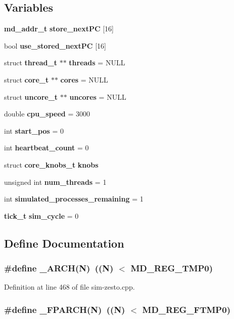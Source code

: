 \subsection*{Variables}
\begin{CompactItemize}
\item 
{\bf md\_\-addr\_\-t} {\bf store\_\-nextPC} [16]
\item 
bool {\bf use\_\-stored\_\-nextPC} [16]
\item 
struct {\bf thread\_\-t} $\ast$$\ast$ {\bf threads} = NULL
\item 
struct {\bf core\_\-t} $\ast$$\ast$ {\bf cores} = NULL
\item 
struct {\bf uncore\_\-t} $\ast$$\ast$ {\bf uncores} = NULL
\item 
double {\bf cpu\_\-speed} = 3000
\item 
int {\bf start\_\-pos} = 0
\item 
int {\bf heartbeat\_\-count} = 0
\item 
struct {\bf core\_\-knobs\_\-t} {\bf knobs}
\item 
unsigned int {\bf num\_\-threads} = 1
\item 
int {\bf simulated\_\-processes\_\-remaining} = 1
\item 
{\bf tick\_\-t} {\bf sim\_\-cycle} = 0
\end{CompactItemize}


\subsection{Define Documentation}
\subsubsection[{\_\-ARCH}]{\setlength{\rightskip}{0pt plus 5cm}\#define \_\-ARCH(N)~((N) $<$ MD\_\-REG\_\-TMP0)}\label{sim-zesto_8cpp_93a68b4412d259f67d1257b64267534d}




Definition at line 468 of file sim-zesto.cpp.
\subsubsection[{\_\-FPARCH}]{\setlength{\rightskip}{0pt plus 5cm}\#define \_\-FPARCH(N)~((N) $<$ MD\_\-REG\_\-FTMP0)}\label{sim-zesto_8cpp_4c385ed05e0bd8490781f35a122a0241}




